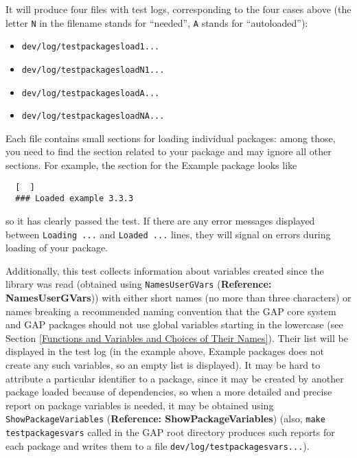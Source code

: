 \documentclass[a4paper,11pt]{report}
\begin{document}
{{{ It will produce four files with test logs, corresponding to the four cases
above (the letter \texttt{N} in the filename stands for ``needed'', \texttt{A} stands for ``autoloaded''): 
\begin{itemize}
\item  \texttt{dev/log/testpackagesload1{\textunderscore}...} 
\item  \texttt{dev/log/testpackagesloadN1{\textunderscore}...} 
\item  \texttt{dev/log/testpackagesloadA{\textunderscore}...} 
\item  \texttt{dev/log/testpackagesloadNA{\textunderscore}...} 
\end{itemize}
 Each file contains small sections for loading individual packages: among
those, you need to find the section related to your package and may ignore all
other sections. For example, the section for the \textsf{Example} package looks like 
\begin{Verbatim}[commandchars=!@|,fontsize=\small,frame=single,label=Example]
  %%% Loading example 3.3.3
  [  ]
  ### Loaded example 3.3.3
\end{Verbatim}
 so it has clearly passed the test. If there are any error messages displayed
between \texttt{Loading ...} and \texttt{Loaded ...} lines, they will signal on errors during loading of your package. 

 Additionally, this test collects information about variables created since the
library was read (obtained using \texttt{NamesUserGVars} (\textbf{Reference: NamesUserGVars})) with either short names (no more than three characters) or names breaking a
recommended naming convention that the \textsf{GAP} core system and \textsf{GAP} packages should not use global variables starting in the lowercase (see
Section \ref{Functions and Variables and Choices of Their Names}). Their list will be displayed in the test log (in the example above, \textsf{Example} packages does not create any such variables, so an empty list is displayed).
It may be hard to attribute a particular identifier to a package, since it may
be created by another package loaded because of dependencies, so when a more
detailed and precise report on package variables is needed, it may be obtained
using \texttt{ShowPackageVariables} (\textbf{Reference: ShowPackageVariables}) (also, \texttt{make testpackagesvars} called in the \textsf{GAP} root directory produces such reports for each package and writes them to a
file \texttt{dev/log/testpackagesvars{\textunderscore}...}). 

}}}
\end{document}
